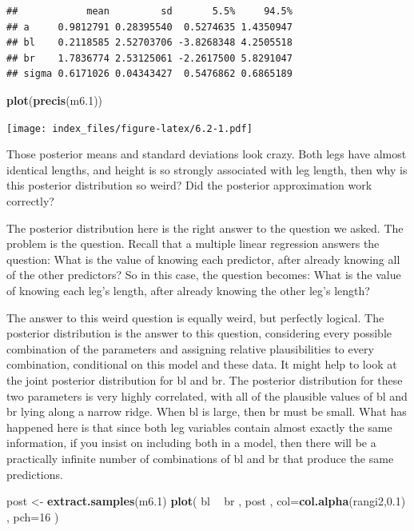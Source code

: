 \documentclass[
]{article}
\newenvironment{Shaded}{\begin{snugshade}}{\end{snugshade}}
\newcommand{\DataTypeTok}[1]{\textcolor[rgb]{0.13,0.29,0.53}{#1}}
\newcommand{\DecValTok}[1]{\textcolor[rgb]{0.00,0.00,0.81}{#1}}
\newcommand{\FloatTok}[1]{\textcolor[rgb]{0.00,0.00,0.81}{#1}}
\newcommand{\KeywordTok}[1]{\textcolor[rgb]{0.13,0.29,0.53}{\textbf{#1}}}
\newcommand{\NormalTok}[1]{#1}
\newcommand{\OperatorTok}[1]{\textcolor[rgb]{0.81,0.36,0.00}{\textbf{#1}}}
\newcommand{\StringTok}[1]{\textcolor[rgb]{0.31,0.60,0.02}{#1}}
\begin{document}
\begin{verbatim}
##            mean         sd       5.5%     94.5%
## a     0.9812791 0.28395540  0.5274635 1.4350947
## bl    0.2118585 2.52703706 -3.8268348 4.2505518
## br    1.7836774 2.53125061 -2.2617500 5.8291047
## sigma 0.6171026 0.04343427  0.5476862 0.6865189
\end{verbatim}

\begin{Shaded}
\begin{Highlighting}[]
\KeywordTok{plot}\NormalTok{(}\KeywordTok{precis}\NormalTok{(m6}\FloatTok{.1}\NormalTok{))}
\end{Highlighting}
\end{Shaded}

\texttt{[image: index\_files/figure-latex/6.2-1.pdf]}

Those posterior means and standard deviations look crazy. Both legs have
almost identical lengths, and height is so strongly associated with leg
length, then why is this posterior distribution so weird? Did the
posterior approximation work correctly?

The posterior distribution here is the right answer to the question we
asked. The problem is the question. Recall that a multiple linear
regression answers the question: What is the value of knowing each
predictor, after already knowing all of the other predictors? So in this
case, the question becomes: What is the value of knowing each leg's
length, after already knowing the other leg's length?

The answer to this weird question is equally weird, but perfectly
logical. The posterior distribution is the answer to this question,
considering every possible combination of the parameters and assigning
relative plausibilities to every combination, conditional on this model
and these data. It might help to look at the joint posterior
distribution for bl and br. The posterior distribution for these two
parameters is very highly correlated, with all of the plausible values
of bl and br lying along a narrow ridge. When bl is large, then br must
be small. What has happened here is that since both leg variables
contain almost exactly the same information, if you insist on including
both in a model, then there will be a practically infinite number of
combinations of bl and br that produce the same predictions.

\begin{Shaded}
\begin{Highlighting}[]
\NormalTok{post <-}\StringTok{ }\KeywordTok{extract.samples}\NormalTok{(m6}\FloatTok{.1}\NormalTok{)}
\KeywordTok{plot}\NormalTok{( bl }\OperatorTok{~}\StringTok{ }\NormalTok{br , post , }\DataTypeTok{col=}\KeywordTok{col.alpha}\NormalTok{(rangi2,}\FloatTok{0.1}\NormalTok{) , }\DataTypeTok{pch=}\DecValTok{16}\NormalTok{ )}
\end{Highlighting}
\end{Shaded}
\end{document}
